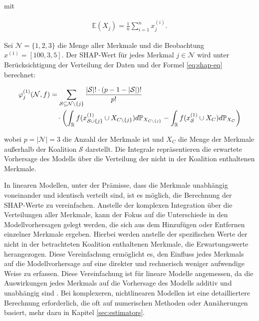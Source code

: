 mit 

\begin{align}
    \label{eq:e}
    \mathbb{E}(X_j) = \frac{1}{n} \sum_{i=1}^{n} x_j^{(i)}.
\end{align}     

Sei $\mathcal{N} = \{1, 2, 3\}$ die Menge aller Merkmale und die Beobachtung $x^{(1)} = [100, 3, 5]$. 
Der SHAP-Wert für jedes Merkmal $j \in \mathcal{N}$ wird unter Berücksichtigung der Verteilung der 
Daten und der Formel \ref{eq:shap-eq} berechnet:

\begin{align}
    \label{eq:shap-formular}
    \varphi^{(1)}_{j} (\mathcal{N}, f) &= \sum_{\mathcal{S} \subseteq \mathcal{N} \setminus \{j\}} \frac{|\mathcal{S}|! \cdot (p - 1 - |\mathcal{S}|)!}{p!} \\ \notag
    &\quad \cdot \left( \int_{\mathbb{R}} f(x^{(1)}_{\mathcal{S} \cup \{j\}} \cup X_{C \setminus \{j\}}) d\mathbb{P}_{X_{C \setminus \{j\}}} -
    \int_{\mathbb{R}} f(x^{(1)}_{\mathcal{S}} \cup X_{C}) d\mathbb{P}_{X_{C}} \right) 
\end{align}

wobei $p = |\mathcal{N}| = 3$ die Anzahl der Merkmale ist und $X_C$ die Menge der Merkmale 
außerhalb der Koalition $\mathcal{S}$ darstellt. Die Integrale repräsentieren die erwartete 
Vorhersage des Modells über die Verteilung der nicht in der Koalition enthaltenen Merkmale.

In linearen Modellen, unter der Prämisse, dass die Merkmale unabhängig voneinander und identisch verteilt sind, 
ist es möglich, die Berechnung der SHAP-Werte zu vereinfachen. Anstelle der komplexen Integration 
über die Verteilungen aller Merkmale, kann der Fokus auf die Unterschiede in den Modellvorhersagen gelegt werden, 
die sich aus dem Hinzufügen oder Entfernen einzelner Merkmale ergeben. 
Hierbei werden anstelle der spezifischen Werte der nicht in der betrachteten Koalition enthaltenen Merkmale, 
die Erwartungswerte herangezogen. Diese Vereinfachung ermöglicht es, den Einfluss jedes Merkmals auf 
die Modellvorhersage auf eine direkter und rechnerisch weniger aufwendige Weise zu erfassen.
Diese Vereinfachung ist für lineare Modelle angemessen, da die Auswirkungen jedes Merkmals 
auf die Vorhersage des Modells additiv und unabhängig sind \cite[S. 48]{Molnar_2023}. Bei komplexeren, 
nichtlinearen Modellen ist eine detailliertere Berechnung erforderlich, 
die oft auf numerischen Methoden oder Annäherungen basiert, mehr dazu in Kapitel \ref{sec:estimators}.

